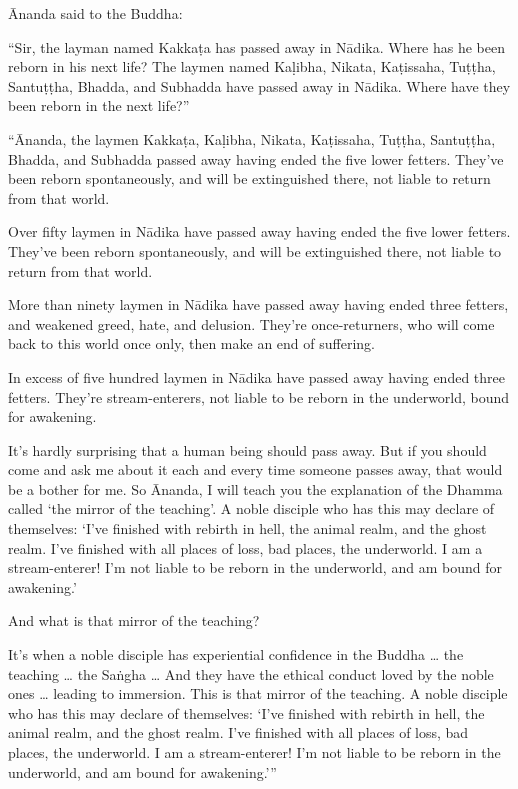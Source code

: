 \documentclass[12pt,openany]{book}%
\begin{document}
Ānanda said to the Buddha: 

“Sir, the layman named \textsanskrit{Kakkaṭa} has passed away in \textsanskrit{Nādika}. Where has he been reborn in his next life? The laymen named \textsanskrit{Kaḷibha}, Nikata, \textsanskrit{Kaṭissaha}, \textsanskrit{Tuṭṭha}, \textsanskrit{Santuṭṭha}, Bhadda, and Subhadda have passed away in \textsanskrit{Nādika}. Where have they been reborn in the next life?” 

“Ānanda, the laymen \textsanskrit{Kakkaṭa}, \textsanskrit{Kaḷibha}, Nikata, \textsanskrit{Kaṭissaha}, \textsanskrit{Tuṭṭha}, \textsanskrit{Santuṭṭha}, Bhadda, and Subhadda passed away having ended the five lower fetters. They’ve been reborn spontaneously, and will be extinguished there, not liable to return from that world. 

Over fifty laymen in \textsanskrit{Nādika} have passed away having ended the five lower fetters. They’ve been reborn spontaneously, and will be extinguished there, not liable to return from that world. 

More than ninety laymen in \textsanskrit{Nādika} have passed away having ended three fetters, and weakened greed, hate, and delusion. They’re once-returners, who will come back to this world once only, then make an end of suffering. 

In excess of five hundred laymen in \textsanskrit{Nādika} have passed away having ended three fetters. They’re stream-enterers, not liable to be reborn in the underworld, bound for awakening. 

It’s hardly surprising that a human being should pass away. But if you should come and ask me about it each and every time someone passes away, that would be a bother for me. So Ānanda, I will teach you the explanation of the Dhamma called ‘the mirror of the teaching’. A noble disciple who has this may declare of themselves: ‘I’ve finished with rebirth in hell, the animal realm, and the ghost realm. I’ve finished with all places of loss, bad places, the underworld. I am a stream-enterer! I’m not liable to be reborn in the underworld, and am bound for awakening.’ 

And what is that mirror of the teaching? 

It’s when a noble disciple has experiential confidence in the Buddha … the teaching … the \textsanskrit{Saṅgha} … And they have the ethical conduct loved by the noble ones … leading to immersion. This is that mirror of the teaching. A noble disciple who has this may declare of themselves: ‘I’ve finished with rebirth in hell, the animal realm, and the ghost realm. I’ve finished with all places of loss, bad places, the underworld. I am a stream-enterer! I’m not liable to be reborn in the underworld, and am bound for awakening.’” 
\end{document}
